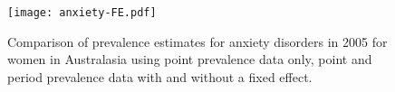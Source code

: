     \begin{figure}[h]
        \begin{center}
            \texttt{[image: anxiety-FE.pdf]}
            \caption{Comparison of prevalence estimates for anxiety disorders in 2005 for women in Australasia using point prevalence data only, point and period prevalence data with and without a fixed effect.}
            \label{fig:app-anxiety FE}
        \end{center}
    \end{figure}

